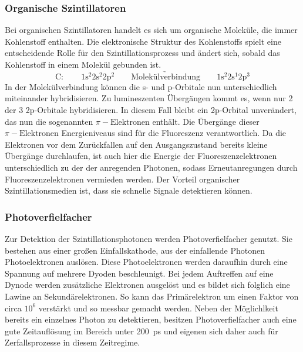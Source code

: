             \subsubsection*{Organische Szintillatoren}
                Bei organischen Szintillatoren handelt es sich um organische Moleküle, die immer Kohlenstoff enthalten. Die elektronische Struktur des Kohlenstoffs spielt eine entscheidende Rolle für den
                Szintillationsprozess und ändert sich, sobald das Kohlenstoff in einem Molekül gebunden ist.
                \begin{equation*}
                    \text{C}: \qquad 1\text{s}^2 2\text{s}^2 2\text{p}^2 \qquad \underrightarrow{\text{Molekülverbindung}} \qquad 1\text{s}^2 2\text{s}^1 2\text{p}^3
                \end{equation*}
                In der Molekülverbindung können die s- und p-Orbitale nun unterschiedlich miteinander hybridisieren. Zu lumineszenten Übergängen kommt es, wenn nur 2 der 3 2p-Orbitale hybridisieren. In diesem
                Fall bleibt ein 2p-Orbital unverändert, das nun die sogenannten $\pi-\text{Elektronen}$ enthält. Die Übergänge dieser $\pi-\text{Elektronen}$ Energieniveaus sind für die Fluoreszenz verantwortlich.
                Da die Elektronen vor dem Zurückfallen auf den Ausgangszustand bereits kleine Übergänge durchlaufen, ist auch hier die Energie der Fluoreszenzelektronen unterschiedlich zu der der anregenden
                Photonen, sodass Erneutanregungen durch Fluoreszenzelektronen vermieden werden. Der Vorteil organischer Szintillationsmedien ist, dass sie schnelle Signale detektieren können.
            \newpage
            \subsubsection*{Photoverfielfacher}
                Zur Detektion der Szintillationsphotonen werden Photoverfielfacher genutzt. Sie bestehen aus einer großen Einfallskathode, aus der einfallende Photonen Photoelektronen auslösen. Diese
                Photoelektronen werden daraufhin durch eine Spannung auf mehrere Dyoden beschleunigt. Bei jedem Auftreffen auf eine Dynode werden zusätzliche Elektronen ausgelöst und es bildet sich 
                folglich eine Lawine an Sekundärelektronen. So kann das Primärelektron um einen Faktor von circa $10^6$ verstärkt und so messbar gemacht werden. Neben der Möglichlkeit bereits ein einzelnes 
                Photon zu detektieren, besitzen Photoverfielfacher auch eine gute Zeitauflösung im  Bereich unter \SI{200}{\pico\second} und eigenen sich daher auch für Zerfallsprozesse in diesem Zeitregime.

